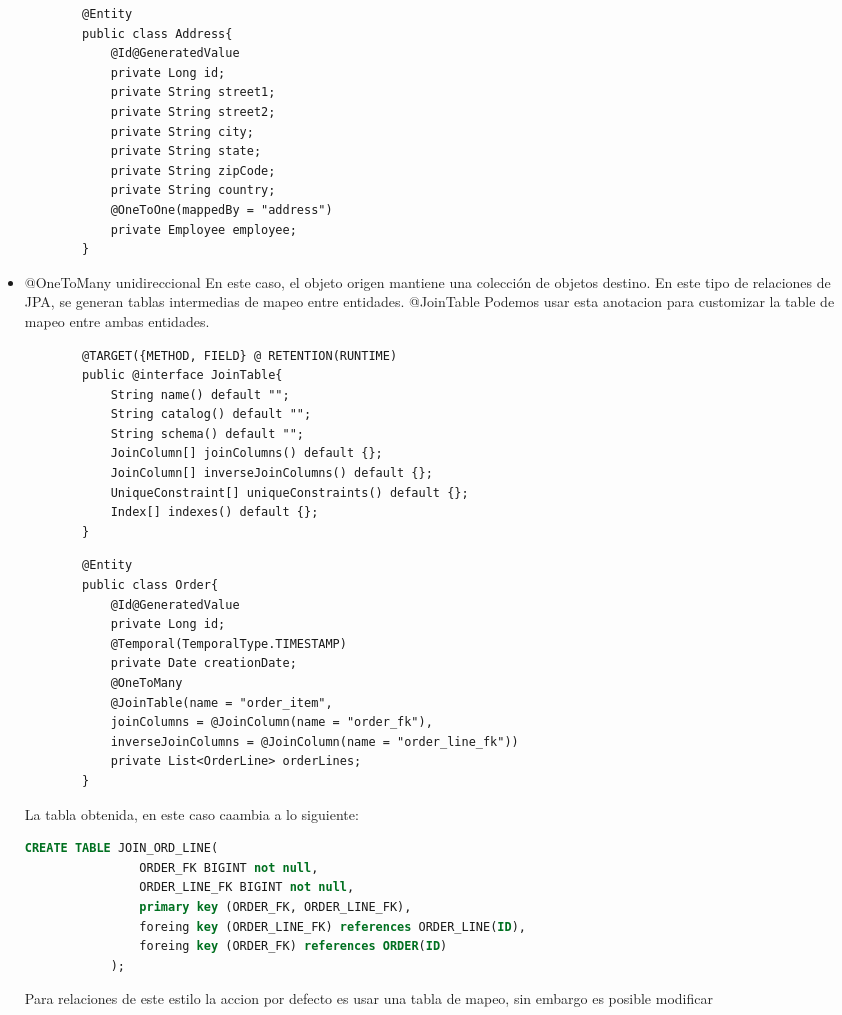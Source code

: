 \documentclass{article}
\begin{document}
\begin{itemize}
\begin{lstlisting}
        @Entity
        public class Address{
            @Id@GeneratedValue
            private Long id;
            private String street1;
            private String street2;
            private String city;
            private String state;
            private String zipCode;
            private String country;
            @OneToOne(mappedBy = "address")
            private Employee employee;
        }
    \end{lstlisting}
	\item @OneToMany unidireccional
	      \subitem En este caso, el objeto origen mantiene una colección de objetos destino. En este tipo de relaciones de JPA,
	      se generan tablas intermedias de mapeo entre entidades.
	      \subitem @JoinTable
	      \subsubitem Podemos usar esta anotacion para customizar la table de mapeo entre ambas entidades.
	      \begin{lstlisting}
        @TARGET({METHOD, FIELD} @ RETENTION(RUNTIME)
        public @interface JoinTable{
            String name() default "";
            String catalog() default "";
            String schema() default "";
            JoinColumn[] joinColumns() default {};
            JoinColumn[] inverseJoinColumns() default {};
            UniqueConstraint[] uniqueConstraints() default {};
            Index[] indexes() default {};
        }
    \end{lstlisting}
	      \begin{lstlisting}
        @Entity
        public class Order{
            @Id@GeneratedValue
            private Long id;
            @Temporal(TemporalType.TIMESTAMP)
            private Date creationDate;
            @OneToMany
            @JoinTable(name = "order_item",
            joinColumns = @JoinColumn(name = "order_fk"),
            inverseJoinColumns = @JoinColumn(name = "order_line_fk"))
            private List<OrderLine> orderLines;
        }
    \end{lstlisting}
	      La tabla obtenida, en este caso caambia a lo siguiente:
	      \begin{lstlisting}[language=SQL]
            CREATE TABLE JOIN_ORD_LINE(
                ORDER_FK BIGINT not null,
                ORDER_LINE_FK BIGINT not null,
                primary key (ORDER_FK, ORDER_LINE_FK),
                foreing key (ORDER_LINE_FK) references ORDER_LINE(ID),
                foreing key (ORDER_FK) references ORDER(ID)
            );
        \end{lstlisting}
	      \subitem Para relaciones de este estilo la accion por defecto es usar una tabla de mapeo, sin embargo es posible modificar

\end{itemize}
\end{document}
